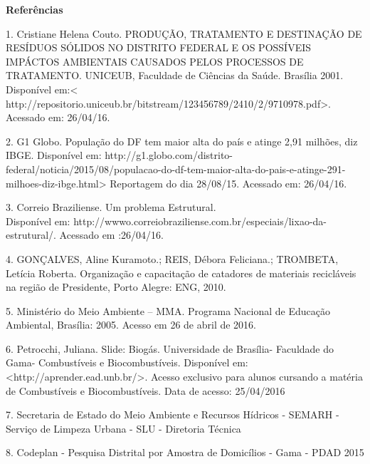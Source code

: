 \clearpage
\begin{table}[ht]
  \centering
  \Huge\textbf{Referências}
\end{table}

1. Cristiane Helena Couto. PRODUÇÃO, TRATAMENTO E DESTINAÇÃO DE RESÍDUOS SÓLIDOS NO DISTRITO FEDERAL E OS POSSÍVEIS IMPÁCTOS AMBIENTAIS CAUSADOS PELOS PROCESSOS DE TRATAMENTO. UNICEUB, Faculdade de Ciências da Saúde. Brasília 2001. \\
Disponível em:< http://repositorio.uniceub.br/bitstream/123456789/2410/2/9710978.pdf>. Acessado em: 26/04/16.


2. G1 Globo. População do DF tem maior alta do país e atinge 2,91 milhões, diz IBGE.
Disponível em: http://g1.globo.com/distrito-federal/noticia/2015/08/populacao-do-df-tem-maior-alta-do-pais-e-atinge-291-milhoes-diz-ibge.html> Reportagem do dia 28/08/15. Acessado em: 26/04/16.


3. Correio Braziliense. Um problema Estrutural. \\
Disponível em: http://wwwo.correiobraziliense.com.br/especiais/lixao-da-estrutural/. Acessado em :26/04/16.


4. GONÇALVES, Aline Kuramoto.; REIS, Débora Feliciana.; TROMBETA, Letícia Roberta. Organização e capacitação de catadores de materiais recicláveis na região de Presidente, Porto Alegre: ENG, 2010.

5. Ministério do Meio Ambiente – MMA. Programa Nacional de Educação Ambiental, Brasília: 2005. Acesso em 26 de abril de 2016.

6. Petrocchi, Juliana. Slide: Biogás. Universidade de Brasília- Faculdade do Gama- Combustíveis e Biocombustíveis. Disponível em: <http://aprender.ead.unb.br/>.
Acesso exclusivo para alunos cursando a matéria de Combustíveis e Biocombustíveis. Data de acesso: 25/04/2016

7. Secretaria de Estado do Meio Ambiente e Recursos Hídricos - SEMARH - Serviço de Limpeza Urbana - SLU - Diretoria Técnica

8. Codeplan - Pesquisa Distrital por Amostra de Domicílios - Gama - PDAD 2015

